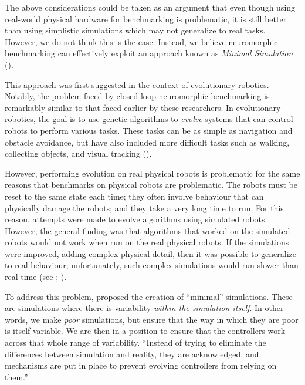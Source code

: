 \documentclass{frontiersSCNS} %
\begin{document}
The above considerations could be taken as an argument that even though using real-world
physical hardware for benchmarking is problematic, it is still better than
using simplistic simulations which may not generalize to real tasks.  However,
we do not think this is the case.  Instead, we believe neuromorphic benchmarking can effectively exploit an approach 
known as \emph{Minimal Simulation}
(\citealt{Jakobi97evolutionaryrobotics}).

This approach was first suggested in the context of evolutionary robotics.  
Notably, the problem faced by closed-loop neuromorphic benchmarking is remarkably 
similar to that faced earlier by these researchers. 
In evolutionary robotics, the
goal is to use genetic algorithms to \emph{evolve} systems that can control
robots to perform various tasks.  These tasks can be as simple as navigation
and obstacle avoidance, but have also included more difficult tasks such as walking,
collecting objects, and visual tracking (\citealt{Nolfi2000}).

However, performing evolution on real physical robots is problematic
for the same reasons that benchmarks on physical robots are problematic.  The
robots must be reset to the same state each time; they often involve
behaviour that can physically damage the robots; and they take a very long
time to run.  For this reason, attempts were made to evolve algorithms using simulated
robots.  However, the general finding was that algorithms that worked on the
simulated robots would not work when run on the real physical robots.  If
the simulations were improved, adding complex physical detail, then it was
possible to generalize to real behaviour; unfortunately, such complex
simulations would run slower than real-time (see \citealt{Husbands1992}; 
\citealt{Husbands1993}).

To address this problem, \cite{Jakobi97evolutionaryrobotics} proposed the creation of
``minimal'' simulations.  These are simulations where there is variability
\emph{within the simulation itself}.  In other words, we make \emph{poor}
simulations, but ensure that the way in which they are poor is itself
variable.  We are then in a position to ensure that the controllers work across that whole
range of variability.  ``Instead of trying to eliminate the differences between
simulation and reality, they are acknowledged, and mechanisms are put in place
to prevent evolving controllers from relying on them.'' \citep[p.~48]{jakobiThesis}
\end{document}
